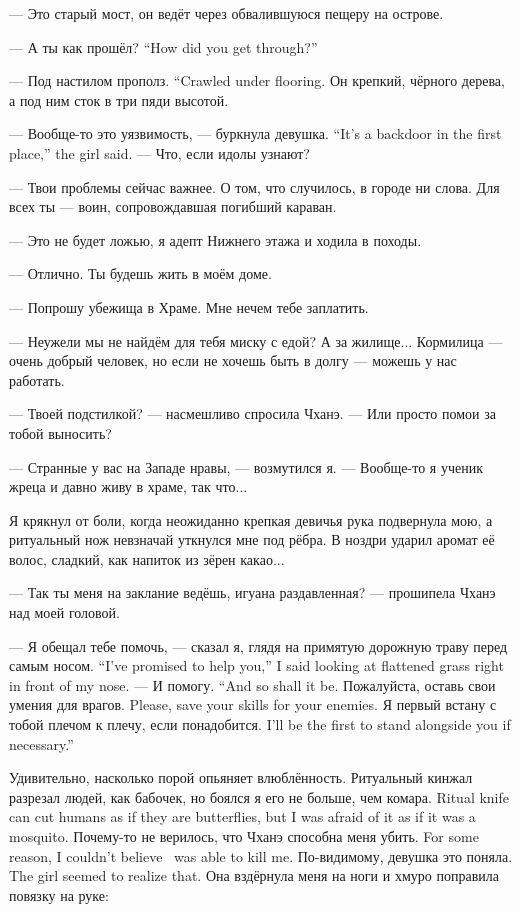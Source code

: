 --- Это старый мост, он ведёт через обвалившуюся пещеру на острове.

{--- А ты как прошёл?}
{``How did you get through?''}

{--- Под настилом прополз.}
{``Crawled under flooring.}
Он крепкий, чёрного дерева, а под ним сток в три пяди высотой.

{--- Вообще-то это уязвимость, --- буркнула девушка.}
{``It's a backdoor in the first place,'' the girl said.}
--- Что, если идолы узнают?

--- Твои проблемы сейчас важнее.
О том, что случилось, в городе ни слова.
Для всех ты --- воин, сопровождавшая погибший караван.

--- Это не будет ложью, я адепт Нижнего этажа и ходила в походы.

--- Отлично.
Ты будешь жить в моём доме.

--- Попрошу убежища в Храме.
Мне нечем тебе заплатить.

--- Неужели мы не найдём для тебя миску с едой?
А за жилище...
Кормилица --- очень добрый человек, но если не хочешь быть в долгу --- можешь у нас работать.

--- Твоей подстилкой? --- насмешливо спросила Чханэ.
--- Или просто помои за тобой выносить?

--- Странные у вас на Западе нравы, --- возмутился я. --- Вообще-то я ученик жреца и давно живу в храме, так что...

Я крякнул от боли, когда неожиданно крепкая девичья рука подвернула мою, а ритуальный нож невзначай уткнулся мне под рёбра.
В ноздри ударил аромат её волос, сладкий, как напиток из зёрен какао...

--- Так ты меня на заклание ведёшь, игуана раздавленная? --- прошипела Чханэ над моей головой.

{--- Я обещал тебе помочь, --- сказал я, глядя на примятую дорожную траву перед самым носом.}
{``I've promised to help you,'' I said looking at flattened grass right in front of my nose.}
{--- И помогу.}
{``And so shall it be.}
{Пожалуйста, оставь свои умения для врагов.}
{Please, save your skills for your enemies.}
{Я первый встану с тобой плечом к плечу, если понадобится.}
{I'll be the first to stand alongside you if necessary.''}

Удивительно, насколько порой опьяняет влюблённость.
{Ритуальный кинжал разрезал людей, как бабочек, но боялся я его не больше, чем комара.}
{Ritual knife can cut humans as if they are butterflies, but I was afraid of it as if it was a mosquito.}
{Почему-то не верилось, что Чханэ способна меня убить.}
{For some reason, I couldn't believe \Chhanei\ was able to kill me.}
{По-видимому, девушка это поняла.}
{The girl seemed to realize that.}
Она вздёрнула меня на ноги и хмуро поправила повязку на руке:

